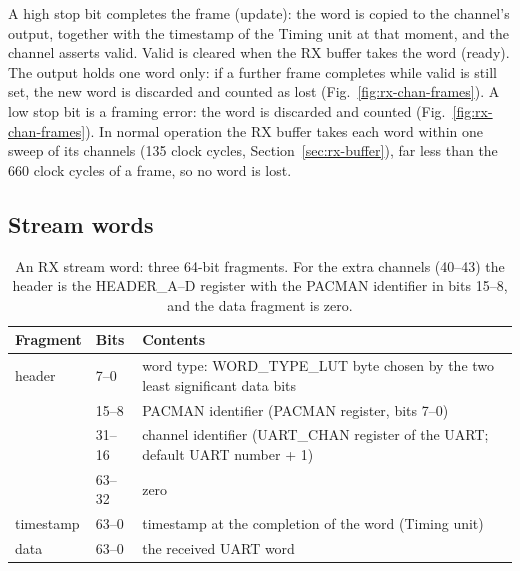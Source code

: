 \documentclass[12pt]{article}
\begin{document}
A high stop bit completes the frame (update): the word is copied to the channel's output, together with the
timestamp of the Timing unit at that moment, and the channel asserts valid.  Valid is cleared when the RX
buffer takes the word (ready).  The output holds one word only: if a further frame completes while valid is
still set, the new word is discarded and counted as lost (Fig.~\ref{fig:rx-chan-frames}).  A low stop bit is a
framing error: the word is discarded and counted (Fig.~\ref{fig:rx-chan-frames}).  In normal operation the RX buffer takes each word within one sweep
of its channels (135 clock cycles, Section~\ref{sec:rx-buffer}), far less than the 660 clock cycles of a
frame, so no word is lost.

\subsection{Stream words}

\begin{table}[htbp]
\caption{\label{tbl:rx-word} An RX stream word: three 64-bit fragments.  For the extra channels (40--43)
  the header is the HEADER\_A--D register with the PACMAN identifier in bits 15--8, and the data fragment is
  zero.}
\begin{center}
\begin{tabularx}{\textwidth}{llL}
\toprule
Fragment   & Bits    & Contents \\
\midrule
header     & 7--0    & word type: WORD\_TYPE\_LUT byte chosen by the two least significant data bits \\
           & 15--8   & PACMAN identifier (PACMAN register, bits 7--0) \\
           & 31--16  & channel identifier (UART\_CHAN register of the UART; default UART number + 1) \\
           & 63--32  & zero \\
timestamp  & 63--0   & timestamp at the completion of the word (Timing unit) \\
data       & 63--0   & the received UART word \\
\bottomrule
\end{tabularx}
\end{center}
\end{table}
\end{document}
